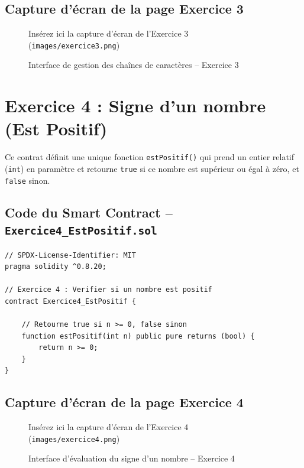 \documentclass[12pt,a4paper]{report}
\begin{document}
\subsection{Capture d'écran de la page Exercice 3}
\begin{figure}[h!]
    \centering
    \begin{tcolorbox}[colback=red!5,colframe=red!50!black,title=Capture d'écran manquante]
        Insérez ici la capture d'écran de l'Exercice 3 (\texttt{images/exercice3.png})
    \end{tcolorbox}
    \caption{Interface de gestion des chaînes de caractères -- Exercice 3}
\end{figure}

\newpage

\section{Exercice 4 : Signe d'un nombre (Est Positif)}
Ce contrat définit une unique fonction \texttt{estPositif()} qui prend un entier relatif
(\texttt{int}) en paramètre et retourne \texttt{true} si ce nombre est supérieur ou égal à zéro,
et \texttt{false} sinon.

\subsection{Code du Smart Contract -- \texttt{Exercice4\_EstPositif.sol}}
\begin{lstlisting}[language=Solidity, caption={Contrat EstPositif.sol -- vérification du signe}]
// SPDX-License-Identifier: MIT
pragma solidity ^0.8.20;

// Exercice 4 : Verifier si un nombre est positif
contract Exercice4_EstPositif {

    // Retourne true si n >= 0, false sinon
    function estPositif(int n) public pure returns (bool) {
        return n >= 0;
    }
}
\end{lstlisting}

\subsection{Capture d'écran de la page Exercice 4}
\begin{figure}[h!]
    \centering
    \begin{tcolorbox}[colback=red!5,colframe=red!50!black,title=Capture d'écran manquante]
        Insérez ici la capture d'écran de l'Exercice 4 (\texttt{images/exercice4.png})
    \end{tcolorbox}
    \caption{Interface d'évaluation du signe d'un nombre -- Exercice 4}
\end{figure}
\end{document}
